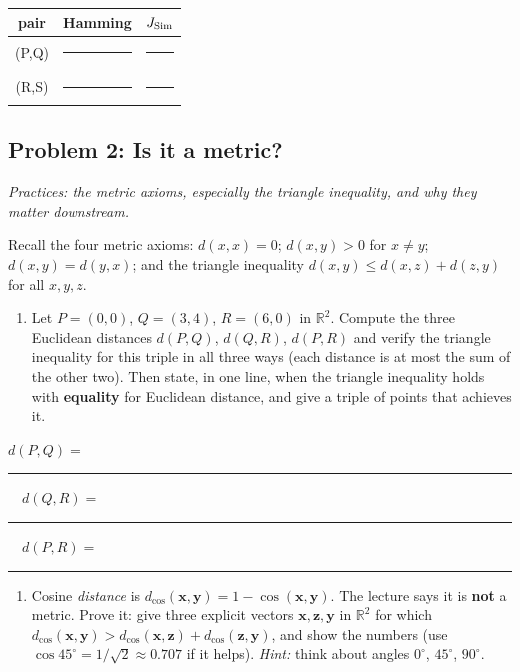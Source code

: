 \documentclass[
  11pt,
]{article}
\providecommand{\tightlist}{%
  \setlength{\itemsep}{0pt}\setlength{\parskip}{0pt}}
\newcommand{\answerspace}[1]{\par\vspace*{#1}}  %
\newcommand{\blank}[1][1.2in]{\rule{#1}{0.4pt}}
\newcommand{\answerpage}{\clearpage}
\begin{document}
\begin{longtable}[]{@{}ccc@{}}
\toprule\noalign{}
pair & Hamming & \(J_{\rm Sim}\) \\
\midrule\noalign{}
\endhead
\bottomrule\noalign{}
\endlastfoot
(P,Q) & \blank[0.8in] & \blank[0.8in] \\
(R,S) & \blank[0.8in] & \blank[0.8in] \\
\end{longtable}

\answerspace{1.8in}

\answerpage

\subsection{Problem 2: Is it a metric?}\label{problem-2-is-it-a-metric}

\emph{Practices: the metric axioms, especially the triangle inequality,
and why they matter downstream.}

Recall the four metric axioms: \(d(x,x)=0\); \(d(x,y)>0\) for
\(x\ne y\); \(d(x,y)=d(y,x)\); and the triangle inequality
\(d(x,y)\le d(x,z)+d(z,y)\) for all \(x,y,z\).

\begin{enumerate}
\def\labelenumi{(\alph{enumi})}
\tightlist
\item
  Let \(P=(0,0)\), \(Q=(3,4)\), \(R=(6,0)\) in \(\mathbb{R}^2\). Compute
  the three Euclidean distances \(d(P,Q)\), \(d(Q,R)\), \(d(P,R)\) and
  verify the triangle inequality for this triple in all three ways (each
  distance is at most the sum of the other two). Then state, in one
  line, when the triangle inequality holds with \textbf{equality} for
  Euclidean distance, and give a triple of points that achieves it.
\end{enumerate}

\(d(P,Q) =\) \blank[0.7in] \(\quad d(Q,R) =\)
\blank[0.7in] \(\quad d(P,R) =\) \blank[0.7in]

\answerspace{1.9in}

\begin{enumerate}
\def\labelenumi{(\alph{enumi})}
\setcounter{enumi}{1}
\tightlist
\item
  Cosine \emph{distance} is
  \(d_{\cos}(\mathbf{x},\mathbf{y}) = 1 - \cos(\mathbf{x},\mathbf{y})\).
  The lecture says it is \textbf{not} a metric. Prove it: give three
  explicit vectors \(\mathbf{x},\mathbf{z},\mathbf{y}\) in
  \(\mathbb{R}^2\) for which
  \(d_{\cos}(\mathbf{x},\mathbf{y}) > d_{\cos}(\mathbf{x},\mathbf{z}) + d_{\cos}(\mathbf{z},\mathbf{y})\),
  and show the numbers (use \(\cos 45^\circ = 1/\sqrt2 \approx 0.707\)
  if it helps). \emph{Hint:} think about angles \(0^\circ\),
  \(45^\circ\), \(90^\circ\).
\end{enumerate}
\end{document}
